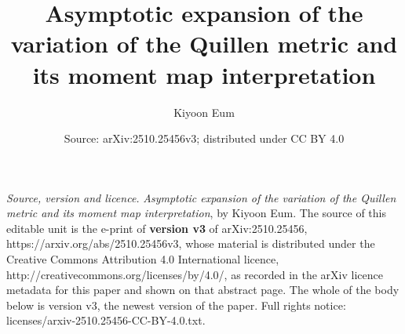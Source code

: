 \documentclass[10pt,a4paper]{amsart}
\theoremstyle{definition}
\theoremstyle{remark}
\begin{document}
\title{Asymptotic expansion of the variation of the Quillen metric and its moment map interpretation}
\author{Kiyoon Eum}
\date{Source: arXiv:2510.25456v3; distributed under CC BY 4.0}
\maketitle
\noindent\emph{Source, version and licence.} \emph{Asymptotic expansion of the variation of the Quillen metric and its moment map interpretation}, by Kiyoon Eum. The source of this editable unit is the e-print of \textbf{version v3} of arXiv:2510.25456, https://arxiv.org/abs/2510.25456v3, whose material is distributed under the Creative Commons Attribution 4.0 International licence, http://creativecommons.org/licenses/by/4.0/, as recorded in the arXiv licence metadata for this paper and shown on that abstract page. The whole of the body below is version v3, the newest version of the paper. Full rights notice: licenses/arxiv-2510.25456-CC-BY-4.0.txt.\par\smallskip
\end{document}
